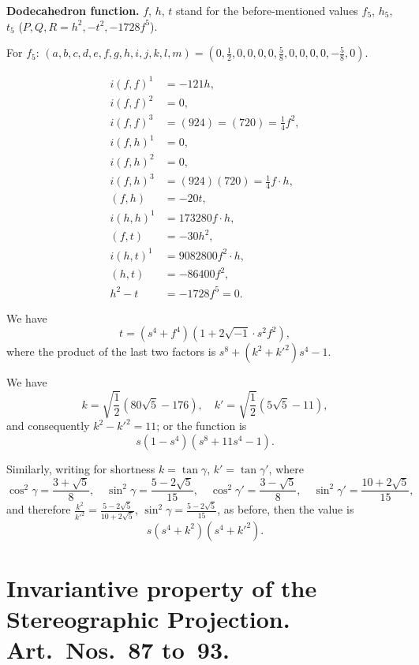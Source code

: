 \documentclass[11pt,a4paper]{book}
\begin{document}
\begin{art}
\textbf{Dodecahedron function.} $f$, $h$, $t$ stand for the before-mentioned
values $f_5$, $h_5$, $t_5$ ($P, Q, R = h^2, -t^2, -1728f^5$).

For $f_5$: $(a, b, c, d, e, f, g, h, i, j, k, l, m) = (0, \frac{1}{2}, 0, 0, 0, 0, \frac{5}{8}, 0, 0, 0, 0, -\frac{5}{8}, 0)$.

\begin{align*}
i(f,f)^1 &= -121h, \\
i(f,f)^2 &= 0, \\
i(f,f)^3 &= (924) = (720) = \frac{1}{4}f^2, \\
i(f,h)^1 &= 0, \\
i(f,h)^2 &= 0, \\
i(f,h)^3 &= (924)(720) = \frac{1}{4}f\cdot h, \\
(f,h) &= -20t, \\
i(h,h)^1 &= 173280f\cdot h, \\
(f,t) &= -30h^2, \\
i(h,t)^1 &= 9082800f^2\cdot h, \\
(h,t) &= -86400f^2, \\
h^2 - t &= -1728f^5 = 0.
\end{align*}
\end{art}

\begin{art}
We have
\[
t = (s^4 + f^4)(1 + 2\sqrt{-1} \cdot s^2 f^2),
\]
where the product of the last two factors is $s^8 + (k^2 + k'^2)s^4 - 1$.

We have
\[
k = \sqrt{\frac{1}{2}}(80\sqrt{5} - 176), \quad k' = \sqrt{\frac{1}{2}}(5\sqrt{5} - 11),
\]
and consequently $k^2 - k'^2 = 11$; or the function is
\[
s(1-s^4)(s^8 + 11s^4 - 1).
\]
\end{art}

\begin{art}
Similarly, writing for shortness $k = \tan\gamma$, $k' = \tan\gamma'$, where
\[
\cos^2\gamma = \frac{3+\sqrt{5}}{8}, \quad \sin^2\gamma = \frac{5-2\sqrt{5}}{15}, \quad
\cos^2\gamma' = \frac{3-\sqrt{5}}{8}, \quad \sin^2\gamma' = \frac{10+2\sqrt{5}}{15},
\]
and therefore $\frac{k^2}{k'^2} = \frac{5-2\sqrt{5}}{10+2\sqrt{5}}$, $\sin^2\gamma = \frac{5-2\sqrt{5}}{15}$, as before, then the
value is
\[
s(s^4 + k^2)(s^4 + k'^2).
\]
\end{art}

\section*{Invariantive property of the Stereographic Projection.
Art.~Nos.~87 to~93.}
\end{document}
